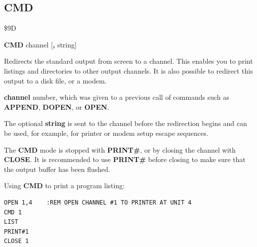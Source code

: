 \subsection{CMD}
\begin{description}[leftmargin=2cm,style=nextline]
\item [Token:] \$9D
\item [Format:] {\bf CMD} channel [{\bf,} string]
\item [Usage:] Redirects the standard output
               from screen to a channel. This enables you to
               print listings and directories to other output channels.
               It is also possible to redirect this output to a disk file,
               or a modem.

               {\bf channel} number, which was given to a previous
               call of commands such as {\bf APPEND}, {\bf DOPEN}, or {\bf OPEN}.

               The optional {\bf string} is sent to the channel
               before the redirection begins and can be used,
               for example, for printer or modem setup escape sequences.

\item [Remarks:] The {\bf CMD} mode is stopped with {\bf PRINT\#},
                 or by closing the channel with {\bf CLOSE}.
                 It is recommended to use {\bf PRINT\#}
                 before closing to make sure that the output buffer
                 has been flushed.

\item [Example:] Using {\bf CMD} to print a program listing:
\begin{tcolorbox}[colback=black,coltext=white]
\verbatimfont{\codefont}
\begin{verbatim}
OPEN 1,4    :REM OPEN CHANNEL #1 TO PRINTER AT UNIT 4
CMD 1
LIST
PRINT#1
CLOSE 1
\end{verbatim}
\end{tcolorbox}
\end{description}


\newpage
